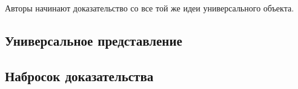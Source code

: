 Авторы начинают доказательство со все той же идеи универсального объекта.

\subsection{Универсальное представление}

\subsection{Набросок доказательства}